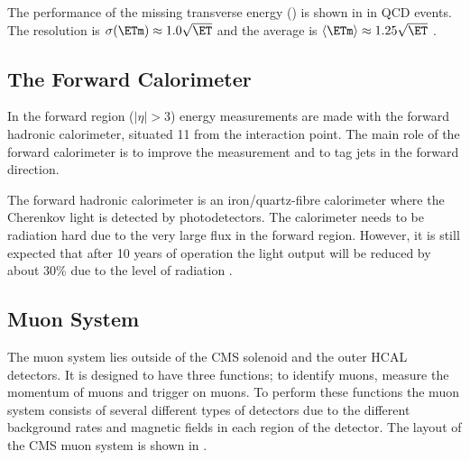 The performance of the missing transverse energy (\ETm) is shown in
 in QCD events. The \ETm resolution is
$\sigma(\ETm) \approx 1.0 \sqrt \ET$ and the average \ETm is 
$\langle \ETm \rangle \approx 1.25 \sqrt \ET$ \cite{chatrchyan2008cms}.

\subsection{The Forward Calorimeter}
In the forward region ($|\eta| > 3$) energy measurements are made with the
forward hadronic calorimeter, situated \unit{11}{\meter} from the interaction
point. The main role of the forward calorimeter is to improve the \ETm
measurement and to tag jets in the forward direction.

The forward hadronic calorimeter is an iron/quartz-fibre calorimeter where the
Cherenkov light is detected by photodetectors.  The calorimeter needs to be
radiation hard due to the very large flux in the forward region. However, it is
still expected that after 10 years of operation the light output will be reduced by
about \unit{30}{\%} due to the level of radiation \cite{chatrchyan2008cms}. 

\subsection{Muon System}
The muon system lies outside of the CMS solenoid and the outer HCAL detectors.
It is designed to have three functions; to identify muons, measure the momentum
of muons and trigger on muons. To perform these functions the muon system
consists of several different types of detectors due to the different background
rates and magnetic fields in each region of the detector.
The layout of the {CMS} muon system is shown in .

